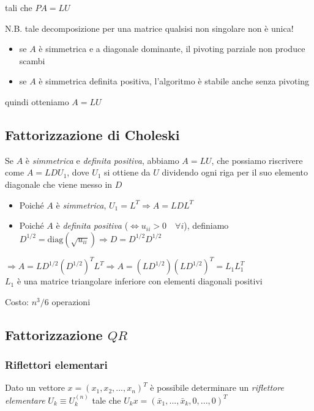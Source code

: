 \documentclass[openany]{book}
\begin{document}
tali che $PA=LU $

N.B. tale decomposizione per una matrice qualsisi non singolare non è unica!

\begin{itemize}
	\item se $A$ è simmetrica e a diagonale dominante, il pivoting parziale non produce scambi
	\item se $ A$ è simmetrica definita positiva, l'algoritmo è stabile anche senza pivoting
\end{itemize}

quindi otteniamo $A=LU$
\subsection {Fattorizzazione di Choleski}

Se $A$ è \textit{simmetrica} e \textit{definita positiva}, abbiamo $A=LU$, che possiamo riscrivere come $A=LDU_1$, dove $U_1$ si ottiene da $U$ dividendo ogni riga per il suo elemento diagonale che viene messo in $D$

\begin{itemize}
	\item Poiché $A$ è \textit{simmetrica}, $U_1 = L^T \Rightarrow A=LDL^T$ 
	\item Poiché $A$ è \textit{definita positiva} ($\Leftrightarrow u_{ii}>0 \quad \forall i$), definiamo $D^{1/2}=\text {diag}(\sqrt {u_{ii}})\Rightarrow D=D^{1/2}D^{1/2}$

\end{itemize}

$\Rightarrow A=LD^{1/2}(D^{1/2})^T L^T\Rightarrow A=(LD^{1/2})(LD^{1/2})^T=L_1L_1^T$
\\

$L_1$ è una matrice triangolare inferiore con elementi diagonali positivi

Costo: $n^3/6$ operazioni
\subsection {Fattorizzazione $QR$}

\subsubsection {Riflettori elementari}

Dato un vettore $x=(x_1,x_2,...,x_n)^T$ è possibile determinare un \textit{riflettore elementare} $U_k \equiv U_k^{(n)}$ tale che $U_kx=(\bar{x}_1,...,\bar{x}_k,0,...,0)^T$
\\
\end{document}

